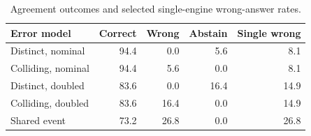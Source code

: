 \begin{table}[!htbp]
\caption{Agreement outcomes and selected single-engine wrong-answer rates.}
\label{tab:collision}
\centering\small
\begin{tabular}{lrrrr}
\toprule
Error model & Correct & Wrong & Abstain & Single wrong \\
\midrule
Distinct, nominal & 94.4 & 0.0 & 5.6 & 8.1 \\
Colliding, nominal & 94.4 & 5.6 & 0.0 & 8.1 \\
Distinct, doubled & 83.6 & 0.0 & 16.4 & 14.9 \\
Colliding, doubled & 83.6 & 16.4 & 0.0 & 14.9 \\
Shared event & 73.2 & 26.8 & 0.0 & 26.8 \\
\bottomrule
\end{tabular}
\end{table}
